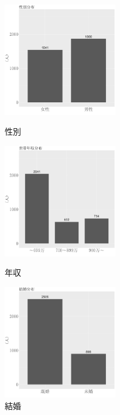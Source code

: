 \documentclass[11pt]{jsarticle}
\begin{document}
\begin{figure}[htbp]
 \begin{minipage}{0.3\hsize}
  \centering
  \includegraphics[width=5cm]{./fig/3-2-2_seibetsu.png}
  \caption{性別}
  \label{fig:consumer_sex}
 \end{minipage}
 \begin{minipage}{0.3\hsize}
  \centering
  \includegraphics[width=5cm]{./fig/3-2-2_nensyu.png}
  \caption{年収}
  \label{fig:consumer_annal_income}
 \end{minipage}
 \begin{minipage}{0.3\hsize}
  \centering
  \includegraphics[width=5cm]{./fig/3-2-2_kekkon.png}
  \caption{結婚}
  \label{fig:consumer_marriage}
 \end{minipage}
\end{figure}

\newpage
\end{document}
